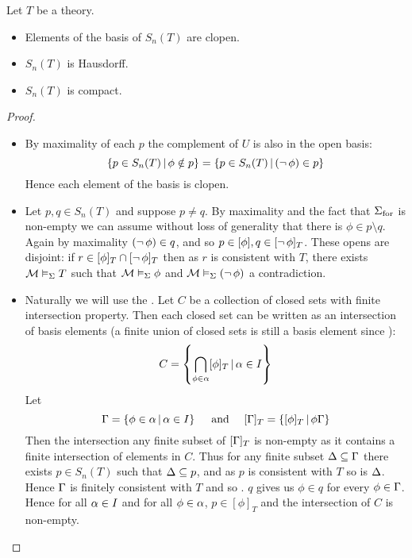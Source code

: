 \begin{prop}
    Let $T$ be a theory.
    \begin{itemize}
        \item Elements of the basis of $S_n(T)$ are clopen.
        \item $S_n(T)$ is Hausdorff.
        \item $S_n(T)$ is compact.
    \end{itemize}
\end{prop}
\begin{proof}~
\begin{itemize}
    \item By maximality of each $p$ the complement of $U$ is also 
        in the open basis:
        \[  
            \left\{p \in S_n(T) \,|\, \phi \notin p\right\}
            = \left\{p \in S_n(T) \,|\, (\neg\, \phi) \in p\right\}
        \]
        Hence each element of the basis is clopen.
    \item Let $p,q \in S_n(T)$ and suppose $p \ne q$. 
        By maximality and the fact that ${\Sigma}_\mathrm{for}$ is non-empty we can assume
        without loss of generality that there is $\phi \in p \setminus q$.
        Again by maximality $(\neg\, \phi) \in q$, 
        and so $p \in [\phi], q \in [\neg\, \phi]_T$.
        These opens are disjoint:
        if $r \in [\phi]_T \cap [\neg\, \phi]_T$ then as 
        $r$ is consistent with $T$, there exists 
        $\mathcal{M} \vDash_{\Sigma} T$ such that 
        $\mathcal{M} \vDash_{\Sigma} \phi$ and $\mathcal{M} \vDash_{\Sigma}(\neg\, \phi)$
        a contradiction. 
    \item Naturally we will use the
        .
        Let $C$ be a collection of closed sets with finite intersection
        property.
        Then each closed set can be written as an intersection of
        basis elements (a finite union of closed sets is still a basis element
        since ):
        \[C = \left\{\bigcap_{\phi \in \alpha}[\phi]_T \,|\, \alpha \in I\right\}\]
        Let 
        \[\Gamma = \left\{\phi \in \alpha \,|\, \alpha \in I\right\} \quad 
        \text{ and } \quad [\Gamma]_T = \left\{[\phi]_T \,|\, \phi \Gamma\right\}\]
        Then the intersection any finite subset of $[\Gamma]_T$ is non-empty as it
        contains a finite intersection of elements in $C$.
        Thus for any finite subset $\Delta \subseteq \Gamma$ 
        there exists $p \in S_n(T)$ such that $\Delta \subseteq p$,
        and as $p$ is consistent with $T$ so is $\Delta$.
        Hence $\Gamma$ is finitely consistent with $T$ and so
        .
         $q$ gives us $\phi \in q$ for every $\phi \in \Gamma$.
        Hence for all $\alpha \in I$ and for all $\phi \in \alpha$, $p \in [\phi]_T$
        and the intersection of $C$ is non-empty.
\end{itemize}\end{proof}

